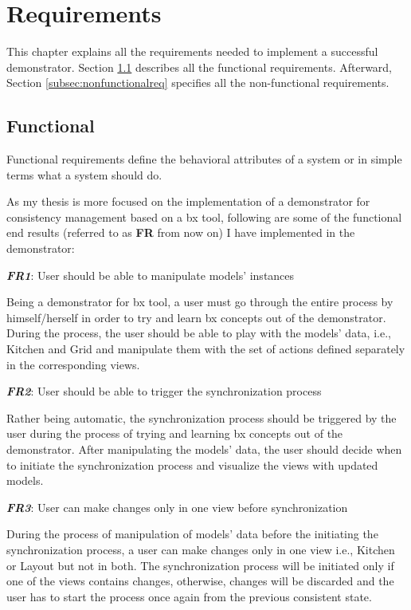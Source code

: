 \section{Requirements}\label{sec:requirements}
This chapter explains all the requirements needed to implement a successful demonstrator. Section \ref{subsec:functionalreq} describes all the functional requirements. Afterward, Section \ref{subsec:nonfunctionalreq} specifies all the non-functional requirements. 

\subsection{Functional}\label{subsec:functionalreq}
Functional requirements define the behavioral attributes of a system \cite{funcandnonfuncreq} or in simple terms what a system should do.

As my thesis is more focused on the implementation of a demonstrator for consistency management based on a bx tool, following are some of the functional end results (referred to as \textbf{FR} from now on) I have implemented in the demonstrator:

\textbf{\textit{FR1}}: User should be able to manipulate models' instances

Being a demonstrator for bx tool, a user must go through the entire process by himself/herself in order to try and learn bx concepts out of the demonstrator. During the process, the user should be able to play with the models' data, i.e., Kitchen and Grid and manipulate them with the set of actions defined separately in the corresponding views.

\textbf{\textit{FR2}}: User should be able to trigger the synchronization process

Rather being automatic, the synchronization process should be triggered by the user during the process of trying and learning bx concepts out of the demonstrator. After manipulating the models' data, the user should decide when to initiate the synchronization process and visualize the views with updated models.

\textbf{\textit{FR3}}: User can make changes only in one view before synchronization

During the process of manipulation of models' data before the initiating the synchronization process, a user can make changes only in one view i.e., Kitchen or Layout but not in both. The synchronization process will be initiated only if one of the views contains changes, otherwise, changes will be discarded and the user has to start the process once again from the previous consistent state.

